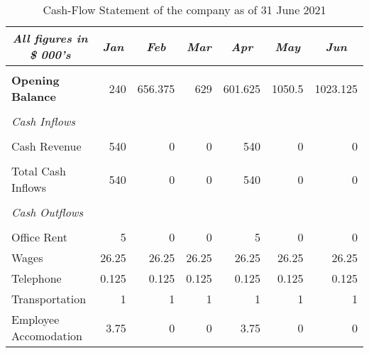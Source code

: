\begin{table}[H]
  \centering
  \caption{Cash-Flow Statement of the company as of 31 June 2021}
    \begin{tabular}{|l|r|r|r|r|r|r|}
    \hline
    \hline
    \toprule
    \multicolumn{1}{|c|}{\textit{\textbf{All figures in \$ 000's}}} & \multicolumn{1}{c|}{\textit{\textbf{Jan}}} & \multicolumn{1}{c|}{\textit{\textbf{Feb}}} & \multicolumn{1}{c|}{\textit{\textbf{Mar}}} & \multicolumn{1}{c|}{\textit{\textbf{Apr}}} & \multicolumn{1}{c|}{\textit{\textbf{May }}} & \multicolumn{1}{c|}{\textit{\textbf{Jun}}} \\
    \midrule
    \hline
    \hline
          &       &       &       &       &       &  \\
    \midrule
    \textbf{Opening Balance} & 240   & 656.375 & 629   & 601.625 & 1050.5 & 1023.125 \\
    \midrule
          &       &       &       &       &       &  \\
    \midrule
    \textit{Cash Inflows} &       &       &       &       &       &  \\
    \midrule
          &       &       &       &       &       &  \\
    \midrule
    Cash Revenue & 540   & 0     & 0     & 540   & 0     & 0 \\
    \midrule
          &       &       &       &       &       &  \\
    \midrule
    Total Cash Inflows & 540   & 0     & 0     & 540   & 0     & 0 \\
    \midrule
          &       &       &       &       &       &  \\
    \midrule
    \textit{Cash Outflows} &       &       &       &       &       &  \\
    \midrule
          &       &       &       &       &       &  \\
    \midrule
    Office Rent  & 5     & 0     & 0     & 5     & 0     & 0 \\
    \midrule
    Wages & 26.25 & 26.25 & 26.25 & 26.25 & 26.25 & 26.25 \\
    \midrule
    Telephone & 0.125 & 0.125 & 0.125 & 0.125 & 0.125 & 0.125 \\
    \midrule
    Transportation & 1     & 1     & 1     & 1     & 1     & 1 \\
    \midrule
    Employee Accomodation & 3.75  & 0     & 0     & 3.75  & 0     & 0 \\

\end{tabular}
\end{table}
